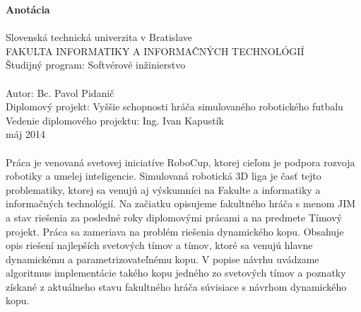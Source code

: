 \begin{titlepage}
\large\textbf{Anotácia}\\\\
\normalsize
Slovenská technická univerzita v Bratislave \\
FAKULTA INFORMATIKY A INFORMAČNÝCH TECHNOLÓGIÍ \\
Študijný program: Softvérové inžinierstvo \\
\\
Autor: Bc. Pavol Pidanič \\
Diplomový projekt: Vyššie schopnosti hráča simulovaného robotického futbalu \\
Vedenie diplomového projektu: Ing. Ivan Kapustík \\ 
máj 2014 \\
\\
Práca je venovaná svetovej iniciatíve RoboCup, ktorej cieľom je podpora rozvoja robotiky a umelej inteligencie. Simulovaná robotická 3D liga je časť tejto problematiky, ktorej sa venujú aj výskumníci na Fakulte a informatiky a informačných technológií. Na začiatku opisujeme fakultného hráča s menom JIM a stav riešenia za posledné roky diplomovými prácami a na predmete Tímový projekt. Práca sa zameriava na problém riešenia dynamického kopu. Obsahuje opis riešení najlepších svetových tímov a tímov, ktoré sa venujú hlavne dynamickému a parametrizovateľnému kopu. V popise návrhu uvádzame algoritmus implementácie takého kopu jedného zo svetových tímov a poznatky získané z aktuálneho stavu fakultného hráča súvisiace s návrhom dynamického kopu.


\end{titlepage}